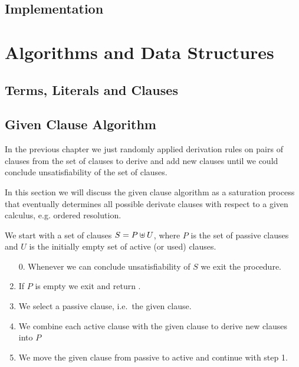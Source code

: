 
\section{Implementation}

\chapter{Algorithms and Data Structures}

\section{Terms, Literals and Clauses}




\section{Given Clause Algorithm}

In the previous chapter we just randomly applied derivation rules
on pairs of clauses from the set of clauses 
to derive and add new clauses 
until we could conclude unsatisfiability of the set of clauses.

In this section we will discuss the given clause algorithm 
as a saturation process that eventually determines all possible derivate clauses
with respect to a given calculus, e.g. ordered resolution.




\begin{procedure}
	We start with a set of clauses $S = P \uplus U$, 
	where $P$ is the set of {\myem passive} clauses 
	and $U$ is the initially empty set of {\myem active} (or used) clauses.
	\begin{enumerate}
		\item[0.] Whenever we can conclude unsatisfiability of $S$ we exit the procedure.
		\setcounter{enumi}{0}
		\item If $P$ is empty we exit and return \SAT.
		\item We select a passive clause, i.e.~the given clause.
		\item We combine each active clause with the given clause to derive new clauses into $P$
		\item We move the given clause from passive to active and continue with step 1.
	\end{enumerate}
\end{procedure}


